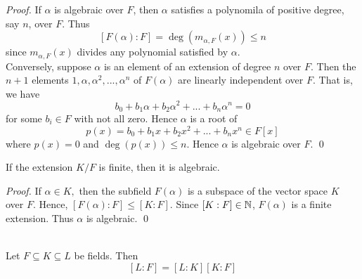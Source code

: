 \begin{proof}
    If $\alpha$ is algebraic over $F$, then $\alpha$ satisfies a polynomila of positive degree, say $n$, over $F$. Thus
    $$[F(\alpha) : F] = \deg (m_{\alpha, F}(x)) \leq n$$
    since $m_{\alpha, F}(x)$ divides any polynomial satisfied by $\alpha$. \\
    Conversely, suppose $\alpha$ is an element of an extension of degree $n$ over $F$. Then the $n+1$ elements $1, \alpha, \alpha^2, ..., \alpha^n$ of $F(\alpha)$ are linearly independent over $F$. That is, we have
    $$b_0 + b_1 \alpha + b_2 \alpha^2 + ... + b_n \alpha^n = 0$$
    for some $b_i \in F$ with not all zero. Hence $\alpha$ is a root of
    $$p(x) = b_0 + b_1 x + b_2 x^2 + ... + b_n x^n \in F[x]$$
    where $p(x) = 0$ and $\deg(p(x)) \leq n$. Hence $\alpha$ is algebraic over $F$.
    \qed
\end{proof}

\begin{corollary}
    If the extension $K/F$ is finite, then it is algebraic.
\end{corollary}

\begin{proof}
    If $\alpha \in K,$ then the subfield $F(\alpha)$ is a subspace of the vector space $K$ over $F$. Hence, $[F(\alpha) : F] \leq [K : F]$. Since $[K : F] \in \mathbb{N}$, $F(\alpha)$ is a finite extension. Thus $\alpha$ is algebraic.
    \qed
\end{proof}

\begin{theorem}  \leavevmode \\
    Let $F \subseteq K \subseteq L$ be fields. Then
    $$[L : F] = [L : K][K:F]$$
\end{theorem}

